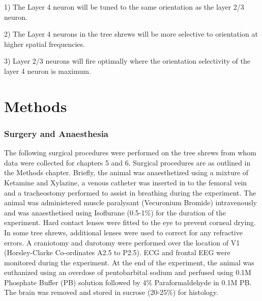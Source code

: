1) The Layer 4 neuron will be tuned to the same orientation as the layer 2/3 neuron.

2) The Layer 4 neurons in the tree shrews will be more selective to orientation at higher spatial frequencies.

3) Layer 2/3 neurons will fire optimally where the orientation selectivity of the layer 4 neuron is maximum.


\section{Methods}


\subsubsection{Surgery and Anaesthesia}

The following surgical procedures were performed on the tree shrews from whom data were collected for chapters 5 and 6. Surgical procedures are as outlined in the Methods chapter. Briefly, the animal was anaesthetized using a mixture of Ketamine and Xylazine, a venous catheter was inserted in to the femoral vein and a tracheostomy performed to assist in breathing during the experiment. The animal was administered muscle paralysant (Vecuronium Bromide) intravenously and was anaesthetised using Isoflurane (0.5-1\%) for the duration of the experiment. Hard contact lenses were fitted to the eye to prevent corneal drying. In some tree shrews, additional lenses were used to correct for any refractive errors. A craniotomy and durotomy were performed over the location of V1 (Horsley-Clarke Co-ordinates A2.5 to P2.5). ECG and frontal EEG were monitored during the experiment. At the end of the experiment, the animal was euthanized using an overdose of pentobarbital sodium and perfused using 0.1M Phosphate Buffer (PB) solution followed by 4\% Paraformaldehyde in 0.1M PB. The brain was removed and stored in sucrose (20-25\%) for histology.

